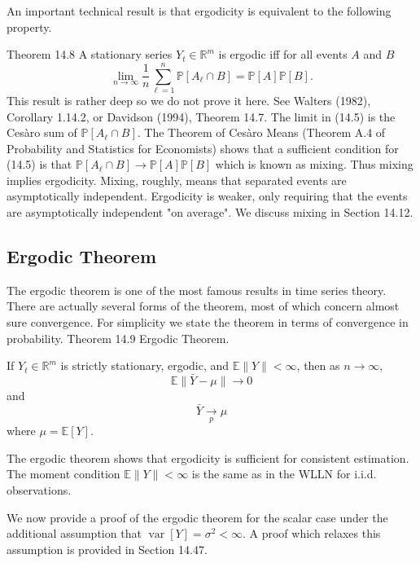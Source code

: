 \documentclass[10pt]{article}
\begin{document}
An important technical result is that ergodicity is equivalent to the following property.

Theorem 14.8 A stationary series $Y_{t} \in \mathbb{R}^{m}$ is ergodic iff for all events $A$ and $B$
$$
\lim _{n \rightarrow \infty} \frac{1}{n} \sum_{\ell=1}^{n} \mathbb{P}\left[A_{\ell} \cap B\right]=\mathbb{P}[A] \mathbb{P}[B] .
$$
This result is rather deep so we do not prove it here. See Walters (1982), Corollary 1.14.2, or Davidson (1994), Theorem 14.7. The limit in (14.5) is the Cesàro sum of $\mathbb{P}\left[A_{\ell} \cap B\right]$. The Theorem of Cesàro Means (Theorem A.4 of Probability and Statistics for Economists) shows that a sufficient condition for (14.5) is that $\mathbb{P}\left[A_{\ell} \cap B\right] \rightarrow \mathbb{P}[A] \mathbb{P}[B]$ which is known as mixing. Thus mixing implies ergodicity. Mixing, roughly, means that separated events are asymptotically independent. Ergodicity is weaker, only requiring that the events are asymptotically independent "on average". We discuss mixing in Section 14.12.

\subsection{Ergodic Theorem}
The ergodic theorem is one of the most famous results in time series theory. There are actually several forms of the theorem, most of which concern almost sure convergence. For simplicity we state the theorem in terms of convergence in probability. Theorem 14.9 Ergodic Theorem.

If $Y_{t} \in \mathbb{R}^{m}$ is strictly stationary, ergodic, and $\mathbb{E}\|Y\|<\infty$, then as $n \rightarrow \infty$,
$$
\mathbb{E}\|\bar{Y}-\mu\| \longrightarrow 0
$$
and
$$
\bar{Y} \underset{p}{\longrightarrow} \mu
$$
where $\mu=\mathbb{E}[Y]$.

The ergodic theorem shows that ergodicity is sufficient for consistent estimation. The moment condition $\mathbb{E}\|Y\|<\infty$ is the same as in the WLLN for i.i.d. observations.

We now provide a proof of the ergodic theorem for the scalar case under the additional assumption that $\operatorname{var}[Y]=\sigma^{2}<\infty$. A proof which relaxes this assumption is provided in Section 14.47.
\end{document}
